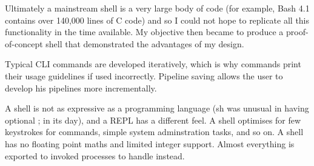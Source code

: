 \documentclass[12pt,twoside,notitlepage]{report}
\begin{document}
Ultimately a mainstream shell is a very large body of code (for example, Bash
4.1 contains over 140,000 lines of C code\footnotemark[1]) and so I could not hope to replicate all
this functionality in the time available. My objective then became to produce a
proof-of-concept shell that demonstrated the advantages of my design.





Typical CLI commands are developed iteratively, which is why commands print
their usage guidelines if used incorrectly. Pipeline saving allows the user to
develop his pipelines more incrementally.

A shell is not as expressive as a programming language (sh was unusual in having
optional ; in its day), and a REPL has a different feel. A shell optimises for
few keystrokes for commands, simple system adminstration tasks, and so on. A
shell has no floating point maths and limited integer support. Almost everything
is exported to invoked processes to handle instead.


\end{document}
